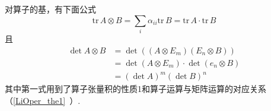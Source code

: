 对算子的基，有下面公式
\begin{equation}
\mathrm{tr}\,A\otimes B=\sum_{i}\alpha_{ii}\mathrm{tr}\,B=\mathrm{tr}\,A\cdot\mathrm{tr}\,B
\end{equation}
且
\begin{equation}
\begin{aligned}
\det A\otimes B&=\det((A\otimes E_m)(E_n\otimes B))\\
&=\det(A\otimes E_m)\cdot\det(e_n\otimes B)\\
&=(\det A)^m(\det B)^n
\end{aligned}
\end{equation}
其中第一式用到了算子张量积的性质1和算子运算与矩阵运算的对应关系（\autoref{LiOper_the1}~）.
